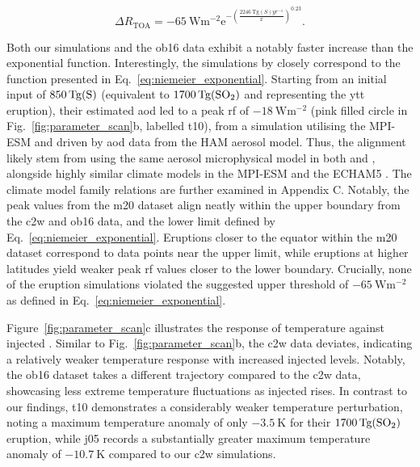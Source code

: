 \documentclass{ametsocV6.1}
\newcommand{\iso}[1][i]{{#1}njected \ce{SO2}}
\begin{document}
\begin{equation}
  \Delta
  R_{\mathrm{TOA}} =
  -\SI{65}{\watt\metre^{-2}}
  \mathrm{e}^{-{\left(\frac{\SI{2246}{\tera\gram(S)yr^{-1}}}{x}\right)}^{0.23}}.
  \label{eq:niemeier_exponential}
\end{equation}

Both our simulations and the \gls{ob16} data exhibit a notably faster increase than the
exponential function. Interestingly, the simulations by \citet{timmreck2010} closely
correspond to the function presented in Eq.~\ref{eq:niemeier_exponential}. Starting from
an initial input of \(\SI{850}{\tera\gram(\ce{S})}\) (equivalent to
\(\SI{1700}{\tera\gram(\ce{SO2})}\) and representing the \gls{ytt} eruption), their
estimated \gls{aod} led to a peak \gls{rf} of \(\SI{-18}{\watt\metre^{-2}}\) (pink
filled circle in Fig.~\ref{fig:parameter_scan}b, labelled \gls{t10}), from a simulation
utilising the MPI-ESM and driven by \gls{aod} data from the HAM aerosol model. Thus, the
alignment likely stem from using the same aerosol microphysical model in both
\citet{timmreck2010} and \citet{niemeier2015}, alongside highly similar climate models
in the MPI-ESM and the ECHAM5 \citep{kuma2023}. The climate model family relations are
further examined in Appendix C. Notably, the peak values from the \gls{m20} dataset
align neatly within the upper boundary from the \gls{c2w} and \gls{ob16} data, and the
lower limit defined by Eq.~\ref{eq:niemeier_exponential}. Eruptions closer to the
equator within the \gls{m20} dataset correspond to data points near the upper limit,
while eruptions at higher latitudes yield weaker peak \gls{rf} values closer to the
lower boundary. Crucially, none of the eruption simulations violated the suggested upper
threshold of \(\SI{-65}{\watt\metre^{-2}}\) as defined in
Eq.~\ref{eq:niemeier_exponential}.

Figure~\ref{fig:parameter_scan}c illustrates the response of temperature against \iso{}.
Similar to Fig.~\ref{fig:parameter_scan}b, the \gls{c2w} data deviates, indicating a
relatively weaker temperature response with increased \iso{} levels. Notably, the
\gls{ob16} dataset takes a different trajectory compared to the \gls{c2w} data,
showcasing less extreme temperature fluctuations as \iso{} rises. In contrast to our
findings, \gls{t10} demonstrates a considerably weaker temperature perturbation, noting
a maximum temperature anomaly of only \(\SI{-3.5}{\kelvin}\) for their
\(\SI{1700}{\tera\gram(\ce{SO2})}\) eruption, while \gls{j05} records a substantially
greater maximum temperature anomaly of \(\SI{-10.7}{\kelvin}\) compared to our \gls{c2w}
simulations.
\end{document}
